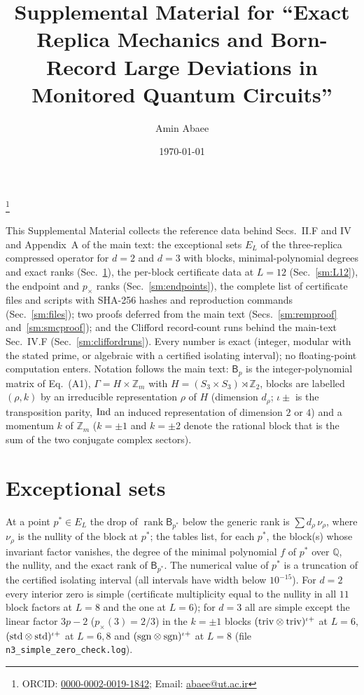 \documentclass[aps,prx,reprint,superscriptaddress,nobibnotes,longbibliography]{revtex4-2}
\newcommand{\rk}{\operatorname{rank}}
\begin{document}
\title{Supplemental Material for ``Exact Replica Mechanics and Born-Record Large Deviations in Monitored Quantum Circuits''}
\author{Amin Abaee}
\thanks{ORCID: \href{https://orcid.org/0000-0002-0019-1842}{0000-0002-0019-1842}; Email: \href{mailto:abaee@ut.ac.ir}{abaee@ut.ac.ir}}
\date{\today}
\maketitle

This Supplemental Material collects the reference data behind Secs.~II.F and IV and Appendix~A of the main text: the exceptional sets $E_L$ of the three-replica compressed operator for $d=2$ and $d=3$ with blocks, minimal-polynomial degrees and exact ranks (Sec.~\ref{sm:E}), the per-block certificate data at $L=12$ (Sec.~\ref{sm:L12}), the endpoint and $p_\times$ ranks (Sec.~\ref{sm:endpoints}), the complete list of certificate files and scripts with SHA-256 hashes and reproduction commands (Sec.~\ref{sm:files}); two proofs deferred from the main text (Secs.~\ref{sm:remproof} and~\ref{sm:smcproof}); and the Clifford record-count runs behind the main-text Sec.~IV.F (Sec.~\ref{sm:cliffordruns}).  Every number is exact (integer, modular with the stated prime, or algebraic with a certified isolating interval); no floating-point computation enters.  Notation follows the main text: $\mathsf B_p$ is the integer-polynomial matrix of Eq.~(A1), $\Gamma=H\times\mathbb Z_m$ with $H=(S_3\times S_3)\rtimes\mathbb Z_2$, blocks are labelled $(\rho,k)$ by an irreducible representation $\rho$ of $H$ (dimension $d_\rho$; $\iota\pm$ is the transposition parity, ${\rm Ind}$ an induced representation of dimension $2$ or $4$) and a momentum $k$ of $\mathbb Z_m$ ($k=\pm1$ and $k=\pm2$ denote the rational block that is the sum of the two conjugate complex sectors).

\section{Exceptional sets}
\label{sm:E}

At a point $p^*\in E_L$ the drop of $\rk\mathsf B_{p^*}$ below the generic rank is $\sum d_\rho\,\nu_\rho$, where $\nu_\rho$ is the nullity of the block at $p^*$; the tables list, for each $p^*$, the block(s) whose invariant factor vanishes, the degree of the minimal polynomial $f$ of $p^*$ over $\mathbb Q$, the nullity, and the exact rank of $\mathsf B_{p^*}$.  The numerical value of $p^*$ is a truncation of the certified isolating interval (all intervals have width below $10^{-15}$).  For $d=2$ every interior zero is simple (certificate multiplicity equal to the nullity in all $11$ block factors at $L=8$ and the one at $L=6$); for $d=3$ all are simple except the linear factor $3p-2$ ($p_\times(3)=2/3$) in the $k=\pm1$ blocks $({\rm triv}\otimes{\rm triv})^{\iota+}$ at $L=6$, $({\rm std}\otimes{\rm std})^{\iota+}$ at $L=6,8$ and $({\rm sgn}\otimes{\rm sgn})^{\iota+}$ at $L=8$ (file \texttt{n3\_simple\_zero\_check.log}).
\end{document}
